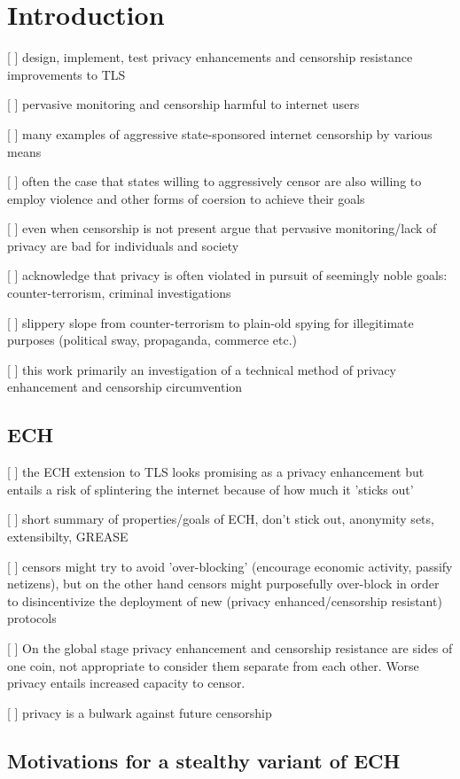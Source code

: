 \chapter{Introduction}

[ ] design, implement, test privacy enhancements and censorship resistance improvements to TLS

[ ] pervasive monitoring and censorship harmful to internet users

[ ] many examples of aggressive state-sponsored internet censorship by various means

[ ] often the case that states willing to aggressively censor are also willing to employ violence and other forms of coersion to achieve their goals

[ ] even when censorship is not present argue that pervasive monitoring/lack of privacy are bad for individuals and society

[ ] acknowledge that privacy is often violated in pursuit of seemingly noble goals: counter-terrorism, criminal investigations

[ ] slippery slope from counter-terrorism to plain-old spying for illegitimate purposes (political sway, propaganda, commerce etc.)

[ ] this work primarily an investigation of a technical method of privacy enhancement and censorship circumvention

\section{ECH}
[ ] the ECH extension to TLS looks promising as a privacy enhancement but entails a risk of splintering the internet because of how much it 'sticks out'

[ ] short summary of properties/goals of ECH, don't stick out, anonymity sets, extensibilty, GREASE

[ ] censors might try to avoid 'over-blocking' (encourage economic activity, passify netizens), but on the other hand censors might purposefully over-block in order to disincentivize the deployment of new (privacy enhanced/censorship resistant) protocols

[ ] On the global stage privacy enhancement and censorship resistance are sides of one coin, not appropriate to consider them separate from each other. Worse privacy entails increased capacity to censor.

[ ] privacy is a bulwark against future censorship

\section{Motivations for a stealthy variant of ECH}

